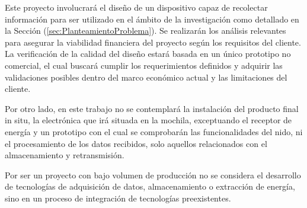 Este proyecto involucrará el diseño de un dispositivo capaz de recolectar información para ser utilizado en el ámbito de la investigación como detallado en la Sección (\ref{sec:PlanteamientoProblema}). Se realizarán los análisis relevantes para asegurar la viabilidad financiera del proyecto según los requisitos del cliente. La verificación de la calidad del diseño estará basada en un único prototipo no comercial, el cual buscará cumplir los requerimientos definidos y adquirir las validaciones posibles dentro del marco económico actual y las limitaciones del cliente. 

Por otro lado, en este trabajo no se contemplará la instalación del producto final in situ, la electrónica que irá situada en la mochila, exceptuando el receptor de energía y un prototipo con el cual se comprobarán las funcionalidades del nido, ni el procesamiento de los datos recibidos, solo aquellos relacionados con el almacenamiento y retransmisión.

Por ser un proyecto con bajo volumen de producción no se considera el desarrollo de tecnologías de adquisición de datos, almacenamiento o extracción de energía, sino en un proceso de integración de tecnologías preexistentes.
